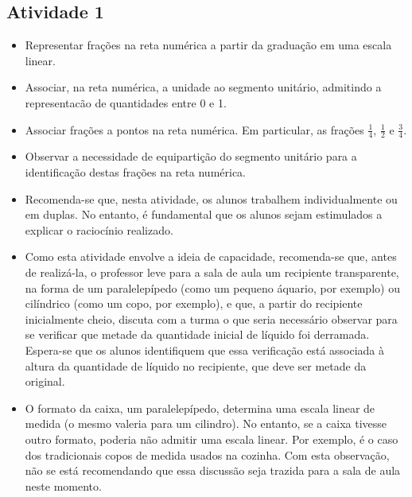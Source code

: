 \begin{multicols}{2}

\subsection{Atividade 1}
\begin{itemize} %
    \item       Representar frações na reta numérica a partir da graduação em uma escala linear.
    \item       Associar, na reta numérica, a unidade ao segmento unitário, admitindo a representacão de quantidades entre 0 e 1.
    \item       Associar frações a pontos na reta numérica. Em particular, as frações       $\frac{1}{4}$,       $\frac{1}{2}$       e       $\frac{3}{4}$.
    \item       Observar a necessidade de equipartição do segmento unitário para a identificação destas frações na reta numérica.    
\end{itemize} %
  
      
\begin{itemize} %
    \item       Recomenda-se que, nesta atividade, os alunos trabalhem individualmente ou em duplas. No entanto, é fundamental que os alunos sejam estimulados a explicar o raciocínio realizado.
    \item       Como esta atividade envolve a ideia de capacidade, recomenda-se que, antes de realizá-la, o professor leve para a sala de aula um recipiente transparente, na forma de um paralelepípedo (como um pequeno áquario, por exemplo) ou cilíndrico  (como um copo, por exemplo), e que, a partir do recipiente inicialmente cheio, discuta com a turma o que seria necessário observar para se verificar que metade da quantidade inicial de líquido foi derramada. Espera-se que os alunos identifiquem que essa verificação está associada à altura da quantidade de líquido no recipiente, que deve ser metade da original.  
    \item       O formato da caixa, um paralelepípedo, determina uma escala linear de medida (o mesmo valeria para um cilindro). No entanto, se a caixa tivesse outro formato, poderia não admitir uma escala linear. Por exemplo, é o caso dos tradicionais copos de medida usados na cozinha. Com esta observação, não se está recomendando que essa discussão seja trazida para a sala de aula neste momento. 
  

\end{itemize}
\end{multicols}
